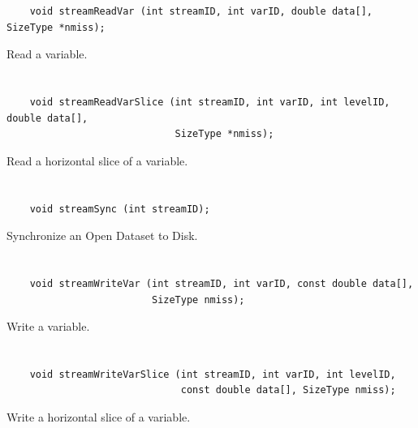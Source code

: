 \begin{verbatim}
    void streamReadVar (int streamID, int varID, double data[], SizeType *nmiss);
\end{verbatim}

Read a variable.


\section*{\tt {}}

\begin{verbatim}
    void streamReadVarSlice (int streamID, int varID, int levelID, double data[],
                             SizeType *nmiss);
\end{verbatim}

Read a horizontal slice of a variable.


\section*{\tt {}}

\begin{verbatim}
    void streamSync (int streamID);
\end{verbatim}

Synchronize an Open Dataset to Disk.


\section*{\tt {}}

\begin{verbatim}
    void streamWriteVar (int streamID, int varID, const double data[],
                         SizeType nmiss);
\end{verbatim}

Write a variable.


\section*{\tt {}}

\begin{verbatim}
    void streamWriteVarSlice (int streamID, int varID, int levelID,
                              const double data[], SizeType nmiss);
\end{verbatim}

Write a horizontal slice of a variable.


